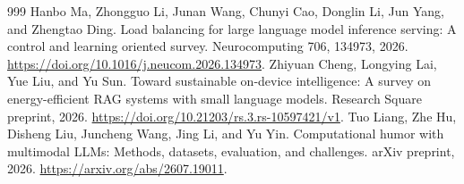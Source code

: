 \documentclass[preprint,12pt]{elsarticle}
\begin{document}
\begin{thebibliography}{999}
 Hanbo Ma, Zhongguo Li, Junan Wang, Chunyi Cao, Donglin Li, Jun Yang, and Zhengtao Ding. Load balancing for large language model inference serving: A control and learning oriented survey. Neurocomputing 706, 134973, 2026. \url{https://doi.org/10.1016/j.neucom.2026.134973}.
 Zhiyuan Cheng, Longying Lai, Yue Liu, and Yu Sun. Toward sustainable on-device intelligence: A survey on energy-efficient RAG systems with small language models. Research Square preprint, 2026. \url{https://doi.org/10.21203/rs.3.rs-10597421/v1}.
 Tuo Liang, Zhe Hu, Disheng Liu, Juncheng Wang, Jing Li, and Yu Yin. Computational humor with multimodal LLMs: Methods, datasets, evaluation, and challenges. arXiv preprint, 2026. \url{https://arxiv.org/abs/2607.19011}.

\end{thebibliography}
\end{document}
